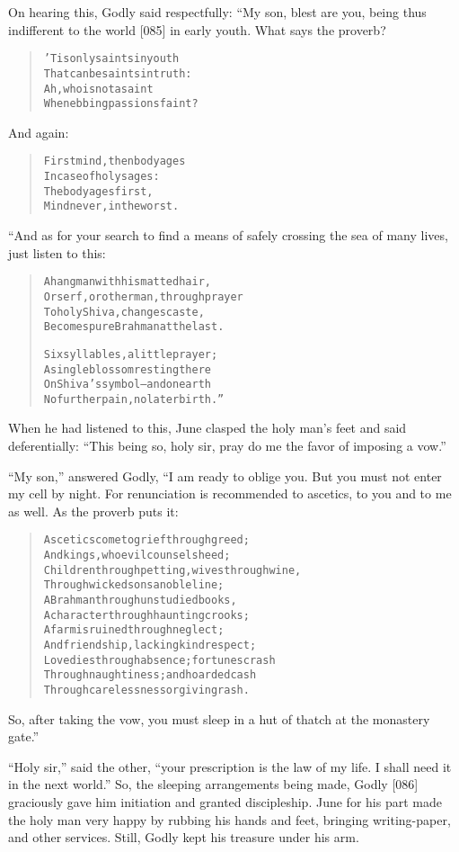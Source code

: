 \documentclass[article, twoside, 14pt]{memoir}
\renewenvironment{verbatim}{%
\begin{quote}%
\vskip -10pt%
\begin{alltt}\normalfont\large}{\end{alltt}%
\end{quote}%
\vskip -10pt
} %
\begin{document}
On hearing this, Godly said respectfully: “My son, blest are you,
being thus indifferent to the world [085] in early youth. What says
the proverb?

\begin{verbatim}
'Tis only saints in youth
That can be saints in truth:
Ah, who is not a saint
When ebbing passions faint?
\end{verbatim}
And again:

\begin{verbatim}
First mind, then body ages
In case of holy sages:
The body ages first,
Mind never, in the worst.
\end{verbatim}
“And as for your search to find a means of safely crossing the sea
of many lives, just listen to this:

\begin{verbatim}
A hangman with his matted hair,
Or serf, or other man, through prayer
To holy Shiva, changes caste,
Becomes pure Brahman at the last.

Six syllables, a little prayer;
A single blossom resting there
On Shiva's symbol--and on earth
No further pain, no later birth.”
\end{verbatim}
When he had listened to this, June clasped the holy man's feet and
said deferentially:
``This being so, holy sir, pray do me the favor of imposing a vow.''

``My son,'' answered Godly, “I am ready to oblige you. But you must
not enter my cell by night. For renunciation is recommended to
ascetics, to you and to me as well. As the proverb puts it:

\begin{verbatim}
Ascetics come to grief through greed;
And kings, who evil counsels heed;
Children through petting, wives through wine,
Through wicked sons a noble line;
A Brahman through unstudied books,
A character through haunting crooks;
A farm is ruined through neglect;
And friendship, lacking kind respect;
Love dies through absence; fortunes crash
Through naughtiness; and hoarded cash
Through carelessness or giving rash.
\end{verbatim}
So, after taking the vow, you must sleep in a hut of thatch at the
monastery gate.”

``Holy sir,'' said the other,
``your prescription is the law of my life. I shall need it in the next world.''
So, the sleeping arrangements being made, Godly [086] graciously
gave him initiation and granted discipleship. June for his part
made the holy man very happy by rubbing his hands and feet,
bringing writing-paper, and other services. Still, Godly kept his
treasure under his arm.
\end{document}
